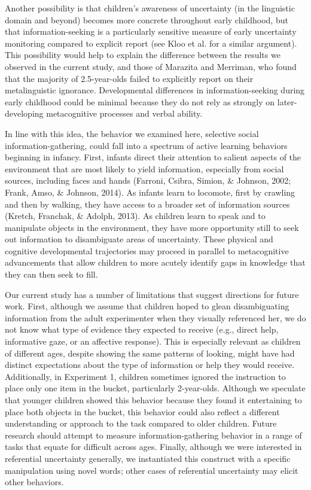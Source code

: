 \documentclass[english,,man]{apa6}
\begin{document}
Another possibility is that children's awareness of uncertainty (in the
linguistic domain and beyond) becomes more concrete throughout early
childhood, but that information-seeking is a particularly sensitive
measure of early uncertainty monitoring compared to explicit report (see
Kloo et al. for a similar argument). This possibility would help to
explain the difference between the results we observed in the current
study, and those of Marazita and Merriman, who found that the majority
of 2.5-year-olds failed to explicitly report on their metalinguistic
ignorance. Developmental differences in information-seeking during early
childhood could be minimal because they do not rely as strongly on
later-developing metacognitive processes and verbal ability.

In line with this idea, the behavior we examined here, selective social
information-gathering, could fall into a spectrum of active learning
behaviors beginning in infancy. First, infants direct their attention to
salient aspects of the environment that are most likely to yield
information, especially from social sources, including faces and hands
(Farroni, Csibra, Simion, \& Johnson, 2002; Frank, Amso, \& Johnson,
2014). As infants learn to locomote, first by crawling and then by
walking, they have access to a broader set of information sources
(Kretch, Franchak, \& Adolph, 2013). As children learn to speak and to
manipulate objects in the environment, they have more opportunity still
to seek out information to disambiguate areas of uncertainty. These
physical and cognitive developmental trajectories may proceed in
parallel to metacognitive advancements that allow children to more
acutely identify gaps in knowledge that they can then seek to fill.

Our current study has a number of limitations that suggest directions
for future work. First, although we assume that children hoped to glean
disambiguating information from the adult experimenter when they
visually referenced her, we do not know what type of evidence they
expected to receive (e.g., direct help, informative gaze, or an
affective response). This is especially relevant as children of
different ages, despite showing the same patterns of looking, might have
had distinct expectations about the type of information or help they
would receive. Additionally, in Experiment 1, children sometimes ignored
the instruction to place only one item in the bucket, particularly
2-year-olds. Although we speculate that younger children showed this
behavior because they found it entertaining to place both objects in the
bucket, this behavior could also reflect a different understanding or
approach to the task compared to older children. Future research should
attempt to measure information-gathering behavior in a range of tasks
that equate for difficult across ages. Finally, although we were
interested in referential uncertainty generally, we instantiated this
construct with a specific manipulation using novel words; other cases of
referential uncertainty may elicit other behaviors.
\end{document}
